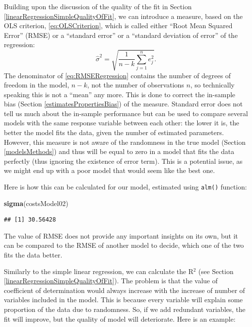 \documentclass[
]{book}
\newenvironment{Shaded}{\begin{snugshade}}{\end{snugshade}}
\newcommand{\FunctionTok}[1]{\textcolor[rgb]{0.13,0.29,0.53}{\textbf{#1}}}
\newcommand{\NormalTok}[1]{#1}
\theoremstyle{definition}
\theoremstyle{definition}
\theoremstyle{definition}
\theoremstyle{definition}
\theoremstyle{remark}
\begin{document}
Building upon the discussion of the quality of the fit in Section \ref{linearRegressionSimpleQualityOfFit}, we can introduce a measure, based on the OLS criterion, \eqref{eq:OLSCriterion}, which is called either ``Root Mean Squared Error'' (RMSE) or a ``standard error'' or a ``standard deviation of error'' of the regression:
\begin{equation}
    \hat{\sigma}^2 = \sqrt{\frac{1}{n-k} \sum_{j=1}^n e_j^2 }.
    \label{eq:RMSERegression}
\end{equation}
The denominator of \eqref{eq:RMSERegression} contains the number of degrees of freedom in the model, \(n-k\), not the number of observations \(n\), so technically speaking this is not a ``mean'' any more. This is done to correct the in-sample bias (Section \ref{estimatesPropertiesBias}) of the measure. Standard error does not tell us much about the in-sample performance but can be used to compare several models with the same response variable between each other: the lower it is, the better the model fits the data, given the number of estimated parameters. However, this measure is not aware of the randomness in the true model (Section \ref{modelsMethods}) and thus will be equal to zero in a model that fits the data perfectly (thus ignoring the existence of error term). This is a potential issue, as we might end up with a poor model that would seem like the best one.

Here is how this can be calculated for our model, estimated using \texttt{alm()} function:

\begin{Shaded}
\begin{Highlighting}[]
\FunctionTok{sigma}\NormalTok{(costsModel02)}
\end{Highlighting}
\end{Shaded}

\begin{verbatim}
## [1] 30.56428
\end{verbatim}

The value of RMSE does not provide any important insights on its own, but it can be compared to the RMSE of another model to decide, which one of the two fits the data better.

Similarly to the simple linear regression, we can calculate the R\(^2\) (see Section \ref{linearRegressionSimpleQualityOfFit}). The problem is that the value of coefficient of determination would always increase with the increase of number of variables included in the model. This is because every variable will explain some proportion of the data due to randomness. So, if we add redundant variables, the fit will improve, but the quality of model will deteriorate. Here is an example:
\end{document}
